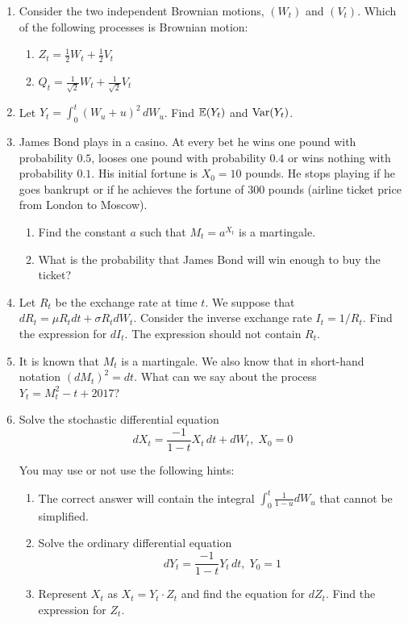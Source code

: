\documentclass[12pt, a4paper]{article}
\begin{document}
\begin{enumerate}

\item Consider the two independent Brownian motions, $(W_t)$ and $(V_t)$. Which of the following processes is Brownian motion:
\begin{enumerate}
\item $Z_t = \frac{1}{2}W_t + \frac{1}{2}V_t$
\item $Q_t = \frac{1}{\sqrt{2}}W_t + \frac{1}{\sqrt{2}}V_t$
\end{enumerate}

\item Let $Y_t = \int_0^t (W_u + u)^2 \, dW_u$. Find $\operatorname{\mathbb{E}}(Y_t)$ and $\operatorname{Var}(Y_t)$.

\item James Bond plays in a casino. At every bet he wins one pound with probability $0.5$, looses one pound with probability $0.4$ or wins nothing with probability $0.1$. His initial fortune is $X_0 = 10$ pounds. He stops playing if he goes bankrupt or if he achieves the fortune of $300$ pounds (airline ticket price from London to Moscow).
\begin{enumerate}
\item Find the constant $a$ such that $M_t = a^{X_t}$ is a martingale.
\item What is the probability that James Bond will win enough to buy the ticket?
\end{enumerate}


\item Let $R_t$ be the exchange rate at time $t$. We suppose that $dR_t = \mu R_t dt + \sigma R_t dW_t$. Consider the inverse exchange rate $I_t = 1/R_t$. Find the expression for $dI_t$. The expression should not contain $R_t$.

\item It is known that $M_t$ is a martingale. We also know that in short-hand notation $(dM_t)^2 = dt$. What can we say about the process $Y_t = M_t^2 - t + 2017$?

\item Solve the stochastic differential equation
\begin{equation}
dX_t = \frac{-1}{1 - t}X_t \, dt + dW_t, \; X_0 = 0
\end{equation}

You may use or not use the following hints:

\begin{enumerate}
\item The correct answer will contain the integral $\int_0^t \frac{1}{1 - u} dW_u$ that cannot be simplified.
\item Solve the ordinary differential equation
\begin{equation}
dY_t = \frac{-1}{1 - t}Y_t \, dt, \; Y_0 = 1
\end{equation}
\item Represent $X_t$ as $X_t = Y_t \cdot Z_t$ and find the equation for $dZ_t$. Find the expression for $Z_t$.
\end{enumerate}


\end{enumerate}
\end{document}
